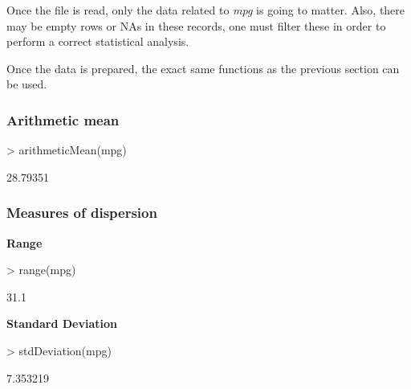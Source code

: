 \documentclass[a4paper]{article}
\begin{document}

Once the file is read, only the data related to \textit{mpg} is going to matter.
Also, there may be empty rows or NAs in these records, one must filter these in
order to perform a correct statistical analysis.

\begin{Schunk}
\end{Schunk}

Once the data is prepared, the exact same functions as the previous section can
be used.


\subsubsection*{Arithmetic mean}
\begin{Schunk}
\begin{Sinput}
> arithmeticMean(mpg)
\end{Sinput}
\begin{Soutput}
[1] 28.79351
\end{Soutput}
\end{Schunk}


\subsubsection*{Measures of dispersion}


\textbf{Range}
\begin{Schunk}
\begin{Sinput}
> range(mpg)
\end{Sinput}
\begin{Soutput}
[1] 31.1
\end{Soutput}
\end{Schunk}

\textbf{Standard Deviation}
\begin{Schunk}
\begin{Sinput}
> stdDeviation(mpg)
\end{Sinput}
\begin{Soutput}
[1] 7.353219
\end{Soutput}
\end{Schunk}
\end{document}
